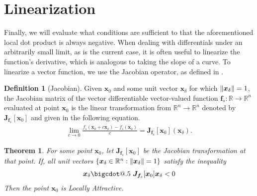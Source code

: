 \documentclass{article}
\makeatletter
\newcommand{\B}[1]{\boldsymbol{#1}}
\newcommand*\bigcdot{\mathpalette\bigcdot@{.5}}
\newcommand*\bigcdot@[2]{\mathbin{\vcenter{\hbox{\scalebox{#2}{$\m@th#1\bullet$}}}}}
\DeclarePairedDelimiter\norm{\lVert}{\rVert}%
\newtheorem{theorem}{Theorem}[section]
\theoremstyle{definition}
\newtheorem{definition}{Definition}[section]
\theoremstyle{remark}
\makeatother
\begin{document}
\section{Linearization}
Finally, we will evaluate what conditions are sufficient to that the aforementioned local dot product
is always negative. When dealing with differentials under an arbitrarily small limit, as is the current case,
it is often useful to linearize the function's derivative, which is analogous to taking the slope of a curve.
To linearize a vector function, we use the Jacobian operator, as defined in \cite{AdvancedCalculus}.

\begin{definition}[Jacobian]
  \label{Jacobian Approximation}
  Given $\B{x}_0$ and some unit vector $\B{x}_\delta$ for which $\norm{\B{x}_\delta} = 1$,
  the Jacobian matrix of the vector differentiable vector-valued function $\B{f}_s : \mathbb{R} \to \mathbb{R}^n$ 
  evaluated at point $\B{x}_0$ is the linear transformation 
  from $\mathbb{R}^n \to \mathbb{R}^n$
  denoted by $\B{J}_{\B{f}_s}[\B{x}_0]$ and given in the following equation.
  \begin{align}
  \lim_{c \to 0} \frac{f_s(\B{x}_0 + c \B{x}_\delta) - f_s(\B{x}_0)}{c} = \B{J}_{\B{f}_s}[\B{x}_0](\B{x}_\delta). \label{jacobian}
  \end{align}
\end{definition}

\begin{theorem}
  \label{theorem:Jacobian Local Attractive}
  For some point $\B{x}_0$, let $\B{J}_{\B{f}_s}[\B{x}_0]$ be the Jacobian transformation at that point. 
  If, all unit vectors $\left\{\B{x}_\delta \in \mathbb{R}^n : \norm{\B{x}_\delta} = 1\right\}$ satisfy the inequality
  \begin{align}
    \B{x}_\delta \bigcdot~ \B{J}_{\B{f}_s}[\B{x}_0] \B{x}_\delta < 0 \label{eq:JacobianDot}
  \end{align}
  Then the point $\B{x}_0$ is Locally Attractive.
\end{theorem}
\end{document}
